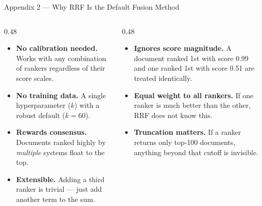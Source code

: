 \documentclass[aspectratio=169]{beamer}
\begin{document}
\begin{frame}{Appendix 2 --- Why RRF Is the Default Fusion Method}
\footnotesize
\begin{columns}[T]
\begin{column}{0.48\textwidth}
\begin{tcolorbox}[colback=green!5!white, colframe=green!60!black,
  title=\textbf{Advantages}]
\begin{itemize}
\item \textbf{No calibration needed.}
      Works with any combination of rankers
      regardless of their score scales.
\item \textbf{No training data.}
      A single hyperparameter ($k$) with a
      robust default ($k=60$).
\item \textbf{Rewards consensus.}
      Documents ranked highly by \emph{multiple}
      systems float to the top.
\item \textbf{Extensible.}
      Adding a third ranker is trivial ---
      just add another term to the sum.
\end{itemize}
\end{tcolorbox}
\end{column}

\begin{column}{0.48\textwidth}
\begin{tcolorbox}[colback=red!5!white, colframe=red!70!black,
  title=\textbf{Limitations}]
\begin{itemize}
\item \textbf{Ignores score magnitude.}
      A document ranked 1st with score 0.99
      and one ranked 1st with score 0.51
      are treated identically.
\item \textbf{Equal weight to all rankers.}
      If one ranker is much better than the other,
      RRF does not know this.
\item \textbf{Truncation matters.}
      If a ranker returns only top-100 documents,
      anything beyond that cutoff is invisible.
\end{itemize}
\end{tcolorbox}

\end{column}
\end{columns}

\end{frame}
%
%
\end{document}
